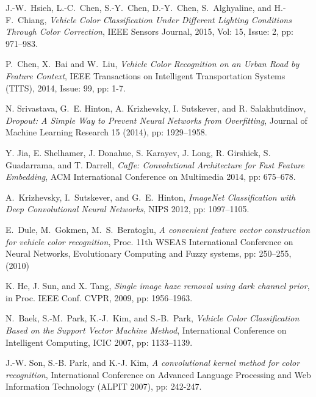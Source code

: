 \documentclass[conference]{IEEEtran}
\begin{document}
\begin{thebibliography}{1}

J.-W.~Hsieh, L.-C.~Chen, S.-Y.~Chen, D.-Y.~Chen, S.~Alghyaline, and H.-F.~Chiang, \emph{Vehicle Color Classification Under Different Lighting Conditions Through Color Correction}, IEEE Sensors Journal, 2015, Vol: 15, Issue: 2, pp: 971--983.

P.~Chen, X.~Bai and W.~Liu, \emph{Vehicle Color Recognition on an Urban Road by Feature Context}, IEEE Transactions on Intelligent Transportation Systems (TITS), 2014, Issue: 99, pp: 1-7.

N. Srivastava, G.~E. Hinton, A. Krizhevsky, I. Sutskever, and R. Salakhutdinov, \emph{Dropout: A Simple Way to Prevent Neural Networks from Overfitting}, Journal of Machine Learning Research 15 (2014), pp: 1929--1958.

Y. Jia, E. Shelhamer, J. Donahue, S. Karayev, J. Long, R. Girshick, S. Guadarrama, and T. Darrell, \emph{Caffe: Convolutional Architecture for Fast Feature Embedding}, ACM International Conference on Multimedia 2014, pp: 675--678.

A.~Krizhevsky, I.~Sutskever, and G.~E.~Hinton, \emph{ImageNet Classification with Deep Convolutional Neural Networks}, NIPS 2012, pp: 1097--1105.

E.~Dule, M.~Gokmen, M.~S.~Beratoglu, \emph{A convenient feature vector construction for vehicle color recognition}, Proc. 11th WSEAS International Conference on Neural Networks, Evolutionary Computing and Fuzzy systems, pp: 250–255, (2010)

K. He, J. Sun, and X. Tang, \emph{Single image haze removal using dark channel prior}, in Proc. IEEE Conf. CVPR, 2009, pp: 1956–1963.

N.~Baek, S.-M.~Park, K.-J.~Kim, and S.-B.~Park, \emph{Vehicle Color Classification Based on the Support Vector Machine Method}, International Conference on Intelligent Computing, {ICIC} 2007, pp: 1133--1139.

J.-W. Son, S.-B. Park, and K.-J. Kim, \emph{A convolutional kernel method for color recognition}, International Conference on Advanced Language Processing and Web Information Technology (ALPIT 2007), pp: 242-247.

\end{thebibliography}
\end{document}
